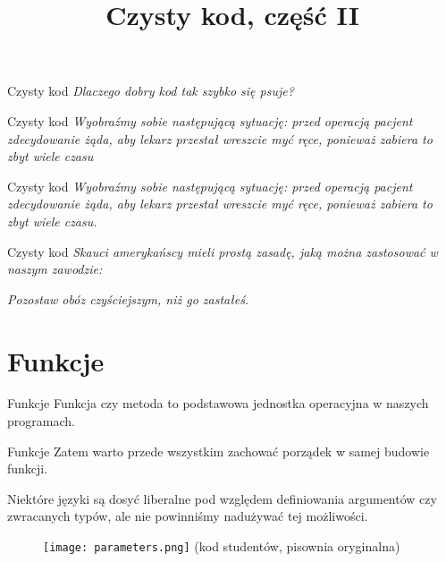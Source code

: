 

\title{Czysty kod, część II}



\begin{frame}{Czysty kod}
	\emph{Dlaczego dobry kod tak szybko się psuje?}
\end{frame}

\begin{frame}{Czysty kod}
	\emph{Wyobraźmy sobie następującą sytuację: przed operacją pacjent zdecydowanie żąda, aby lekarz przestał wreszcie myć ręce, ponieważ zabiera to zbyt wiele czasu}
\end{frame}

\begin{frame}{Czysty kod}
	\emph{Wyobraźmy sobie następującą sytuację: przed operacją pacjent zdecydowanie żąda, aby lekarz przestał wreszcie myć ręce, ponieważ zabiera to zbyt wiele czasu.}
\end{frame}

\begin{frame}{Czysty kod}
	\emph{Skauci amerykańscy mieli prostą zasadę, jaką można zastosować w naszym zawodzie:}
	
	\emph{Pozostaw obóz czyściejszym, niż go zastałeś.}
\end{frame}

\section{Funkcje}

\begin{frame}{Funkcje}
	Funkcja czy metoda to podstawowa jednostka operacyjna w naszych programach.
\end{frame}

\begin{frame}{Funkcje}
	Zatem warto przede wszystkim zachować porządek w samej budowie funkcji.
	
	Niektóre języki są dosyć liberalne pod względem definiowania argumentów czy zwracanych typów, ale nie powinniśmy nadużywać tej możliwości.
\end{frame}

\begin{frame}
	\begin{figure} \centering
		\texttt{[image: parameters.png]}
		\footnotesize{(kod studentów, pisownia oryginalna)}
	\end{figure}
\end{frame}

